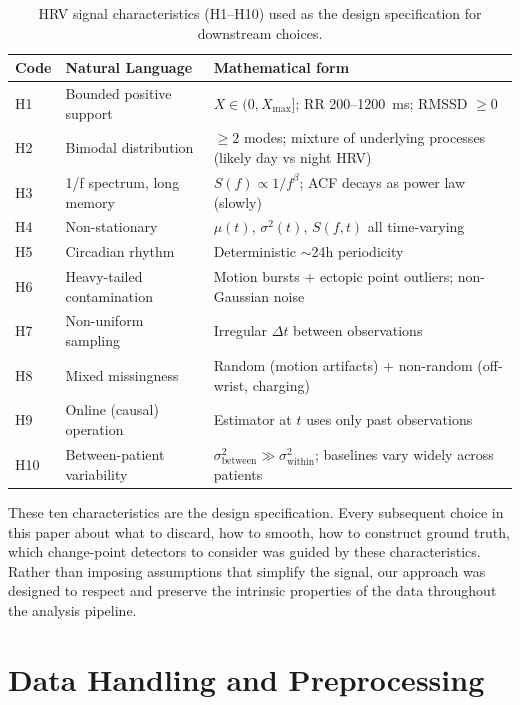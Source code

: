 \documentclass[11pt, a4paper]{article}
\theoremstyle{plain}
\theoremstyle{definition}
\begin{document}
\begin{table}[h!]
\centering
\caption{HRV signal characteristics (H1--H10) used as the design specification for downstream choices.}
\label{tab:signal-characteristics}
\small
\begin{tabular}{p{1.0cm} p{4.5cm} p{8.5cm}}
\toprule
\textbf{Code} & \textbf{Natural Language} & \textbf{Mathematical form} \\
\midrule
H1 & Bounded positive support & $X \in (0, X_{\max}]$; RR 200--1200~ms; RMSSD $\geq 0$ \\
H2 & Bimodal distribution & $\geq 2$ modes; mixture of underlying processes (likely day vs night HRV) \\
H3 & 1/f spectrum, long memory & $S(f) \propto 1/f^{\beta}$; ACF decays as power law (slowly) \\
H4 & Non-stationary & $\mu(t)$, $\sigma^{2}(t)$, $S(f,t)$ all time-varying \\
H5 & Circadian rhythm & Deterministic $\sim$24h periodicity \\
H6 & Heavy-tailed contamination & Motion bursts + ectopic point outliers; non-Gaussian noise \\
H7 & Non-uniform sampling & Irregular $\Delta t$ between observations \\
H8 & Mixed missingness & Random (motion artifacts) + non-random (off-wrist, charging) \\
H9 & Online (causal) operation & Estimator at $t$ uses only past observations \\
H10 & Between-patient variability & $\sigma^{2}_{\text{between}} \gg \sigma^{2}_{\text{within}}$; baselines vary widely across patients \\
\bottomrule
\end{tabular}
\end{table}

These ten characteristics are the design specification. Every subsequent
choice in this paper about what to discard, how to smooth, how to construct
ground truth, which change-point detectors to consider was guided by these
characteristics. Rather than imposing assumptions that simplify the signal,
our approach was designed to respect and preserve the intrinsic properties
of the data throughout the analysis pipeline.

\section{Data Handling and Preprocessing}
\end{document}
